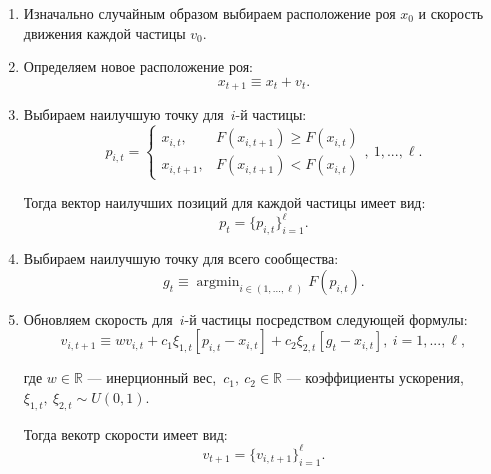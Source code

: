 \begin{enumerate}
	\item Изначально случайным образом выбираем расположение роя $x_0$ и скорость движения каждой частицы $v_0$.

	\item Определяем новое расположение роя:
	\[
		x_{t + 1} \equiv x_t + v_t.
	\]

	\item Выбираем наилучшую точку для~$i$-й частицы:
	\begin{equation}
		\label{eq:personal_best}
		p_{i, t}
		=
		\begin{cases}
			x_{i, t},
			&
			F(x_{i, t + 1}) \geq F(x_{i, t})
			\\
			x_{i, t + 1},
			&
			F(x_{i, t + 1}) < F(x_{i, t})
		\end{cases}, \ 1, ..., \ell.
	\end{equation}

	Тогда вектор наилучших позиций для каждой частицы имеет вид:
	\[
		p_{t} = \{p_{i, t}\}_{i = 1}^{\ell}.
	\]

	\item Выбираем наилучшую точку для всего сообщества:
	\begin{equation}
		\label{eq:social_best}
		g_{t}
		\equiv
		\mathop{\mathrm{argmin}}_{i \in (1, ..., \ell)} \limits F(p_{i, t}).
	\end{equation}

	\item Обновляем скорость для~$i$-й частицы посредством следующей формулы:
	\begin{equation}
		\label{eq:new_velocity}
		v_{i, t + 1}
		\equiv
		w
		v_{i, t}
		+
		c_1
		\xi_{1, t}
		[p_{i, t} - x_{i, t}]
		+
		c_2
		\xi_{2, t}
		[g_{t} - x_{i, t}], \
		i = 1, ..., \ell,
	\end{equation}

	где $w \in \mathbb{R}$ --- инерционный вес,~$c_1,\ c_2 \in \mathbb{R}$ --- коэффициенты ускорения, $\xi_{1, t},\ \xi_{2, t} \sim U(0, 1)$.

	Тогда векотр скорости имеет вид:
	\[
		v_{t+1} = \{v_{i, t + 1}\}_{i = 1}^{\ell}.
	\]

	\vspace{10pt}

	\begin{figure}[!h]
	\centering

\end{figure}
\end{enumerate}
